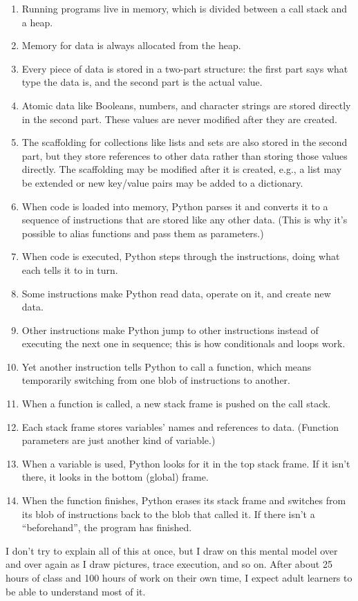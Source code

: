 \begin{enumerate}
\item
  Running programs live in memory, which is divided between a call
  stack and a heap.
\item
  Memory for data is always allocated from the heap.
\item
  Every piece of data is stored in a two-part structure: the first
  part says what type the data is, and the second part is the actual
  value.
\item
  Atomic data like Booleans, numbers, and character strings are stored
  directly in the second part. These values are never modified after
  they are created.
\item
  The scaffolding for collections like lists and sets are also stored
  in the second part, but they store references to other data rather
  than storing those values directly. The scaffolding may be modified
  after it is created, e.g., a list may be extended or new key/value
  pairs may be added to a dictionary.
\item
  When code is loaded into memory, Python parses it and converts it to
  a sequence of instructions that are stored like any other data.
  (This is why it's possible to alias functions and pass them as
  parameters.)
\item
  When code is executed, Python steps through the instructions, doing
  what each tells it to in turn.
\item
  Some instructions make Python read data, operate on it, and create
  new data.
\item
  Other instructions make Python jump to other instructions instead of
  executing the next one in sequence; this is how conditionals and
  loops work.
\item
  Yet another instruction tells Python to call a function, which means
  temporarily switching from one blob of instructions to another.
\item
  When a function is called, a new stack frame is pushed on the call
  stack.
\item
  Each stack frame stores variables' names and references to data.
  (Function parameters are just another kind of variable.)
\item
  When a variable is used, Python looks for it in the top stack frame.
  If it isn't there, it looks in the bottom (global) frame.
\item
  When the function finishes, Python erases its stack frame and
  switches from its blob of instructions back to the blob that called
  it. If there isn't a ``beforehand'', the program has finished.
\end{enumerate}

I don't try to explain all of this at once, but I draw on this mental
model over and over again as I draw pictures, trace execution, and so
on. After about 25 hours of class and 100 hours of work on their own
time, I expect adult learners to be able to understand most of it.
